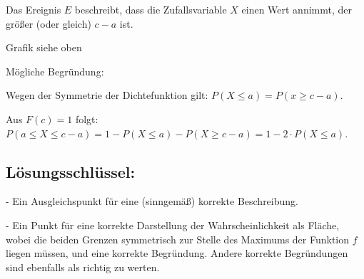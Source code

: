 \begin{langesbeispiel}
{\begin{enumerate}
	Das Ereignis $E$ beschreibt, dass die Zufallsvariable $X$ einen Wert annimmt, der größer (oder gleich) $c-a$ ist.
	
	Grafik siehe oben
	
	Mögliche Begründung:
	
	Wegen der Symmetrie der Dichtefunktion gilt: $P(X\leq a)=P(x\geq c-a)$.
	
	Aus $F(c)=1$ folgt: $P(a\leq X\leq c-a)=1-P(X\leq a)-P(X\geq c-a)=1-2\cdot P(X\leq a)$.
	
	\subsection{Lösungsschlüssel:}
	
	- Ein Ausgleichspunkt für eine (sinngemäß) korrekte Beschreibung.
	
	- Ein Punkt für eine korrekte Darstellung der Wahrscheinlichkeit als Fläche, wobei die beiden Grenzen symmetrisch zur Stelle des Maximums der Funktion $f$ liegen müssen, und eine korrekte Begründung. Andere korrekte Begründungen sind ebenfalls als richtig zu werten.
		\end{enumerate}}		
	
		\end{langesbeispiel}